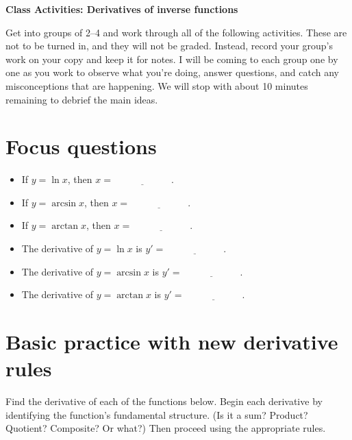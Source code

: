 \documentclass[11pt]{article}
\def\blank{\underline{\hspace{1in}}}
\begin{document}
	
	\thispagestyle{empty}
	\renewcommand{\headrulewidth}{0.0pt}
	\thispagestyle{fancy}
	\lfoot{}
	\cfoot{}
	\rfoot{}	
	
	\vspace*{0in}

		\begin{center}
			\begin{large}
			\textbf{Class Activities: Derivatives of inverse functions} \\
			\end{large}
		\end{center}
	
Get into groups of 2--4 and work through all of the following activities. These are not to be turned in, and they will not be graded. Instead, record your group's work on your copy and keep it for notes. I will be coming to each group one by one as you work to observe what you're doing, answer questions, and catch any misconceptions that are happening. We will stop with about 10 minutes remaining to debrief the main ideas. \\

\section{Focus questions}

\begin{itemize}
	\item If $y = \ln x$, then $x = \blank$. 
	\item If $y = \arcsin x$, then $x = \blank$. 
	\item If $y = \arctan x$, then $x = \blank$. 
	\item The derivative of $y = \ln x$ is $y' = \blank.$ 
	\item The derivative of $y = \arcsin x$ is $y' = \blank$. 
	\item The derivative of $y = \arctan x$ is $y' = \blank$. 
\end{itemize}

\section{Basic practice with new derivative rules}

Find the derivative of each of the functions below. Begin each derivative by identifying the function's fundamental structure. (Is it a sum? Product? Quotient? Composite? Or what?) Then proceed using the appropriate rules. 
\end{document}

